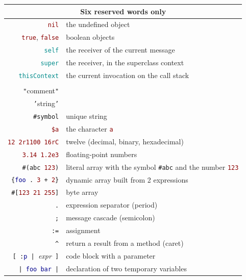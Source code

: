 \documentclass[notumble]{leaflet}
\newcommand{\code}[1]{\foreignlanguage{english}{\texttt{#1}}}
\begin{document}
\noindent
\begin{tabularx}{\linewidth}{@{}rX@{}}
        \toprule
        \multicolumn{2}{c}{Six reserved words only}\\
        \midrule
        \textcolor{darkRed}{\code{nil}} & the undefined object\\
        \textcolor{darkRed}{\code{true}}, \textcolor{darkRed}{\code{false}} & boolean objects\\
        \textcolor{darkCyan}{\code{self}} & the receiver of the current message\\
        \textcolor{darkCyan}{\code{super}} & the receiver, in the superclass context\\
        \textcolor{darkCyan}{\code{thisContext}} & the current invocation on the call stack\\
        \addlinespace

        \toprule
        \multicolumn{2}{c}{Reserved punctuation characters}\\
        \midrule
        \textcolor{comment}{\code{"}{comment}\code{"}} & \\
        \textcolor{string}{\code{'}{string}\code{'}} & \\
        \textcolor{string}{\code{\#symbol}} & unique string \\
        \textcolor{darkRed}{\code{\$a}} & the character \textcolor{darkRed}{\code{a}} \\
        \textcolor{darkRed}{\code{12 2r1100 16rC}} & twelve (decimal, binary, hexadecimal)\\
        \textcolor{darkRed}{\code{3.14 1.2e3}} & floating-point numbers\\
        \code{\#(\textcolor{string}{abc} \textcolor{darkRed}{123})} & literal array with the symbol \textcolor{string}{\code{\#abc}} and the number \textcolor{darkRed}{\code{123}} \\
        \code{\{\textcolor{darkBlue}{foo}\,.\ \textcolor{darkRed}{3}\,+\,\textcolor{darkRed}{2}\}} & dynamic array built from 2 expressions\\
        \code{\#[\textcolor{darkRed}{123 21 255}]} & byte array \\
        \code{.} & expression separator (period)\\
        \code{;} & message cascade (semicolon)\\
        \code{:=} & {assignment} \\
        \code{\textasciicircum} & return a result from a method (caret)\\
        \code{[\,:\textcolor{darkBlue}{p}\,|\,}\emph{expr}\code{\,]} & code block with a parameter \\
        \code{|\,\textcolor{darkBlue}{foo bar}\,|} & declaration of two temporary variables \\
        \bottomrule
\end{tabularx}
\end{document}
